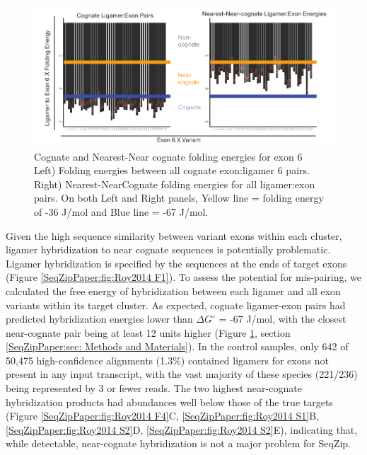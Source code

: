 		\begin{figure} %
			\centering 
			\includegraphics{Figures/SeqZipPaper/Roy2014FigS3.eps}
			\caption[Cognate and Nearest-Near cognate folding energies for \dscam{} exon 6]
			{
				Cognate and Nearest-Near cognate folding energies for \dscam{} exon 6\\[0.25cm]
				Left) Folding energies between all cognate exon:ligamer 6 pairs. Right) Nearest-NearCognate folding energies for all ligamer:exon pairs. On both Left and Right panels, Yellow line = folding energy of -36 J/mol and Blue line = -67 J/mol.
				}
			\label{SeqZipPaper:fig:Roy2014 FS3}
			\end{figure}

		Given the high sequence similarity between variant exons within each cluster, ligamer hybridization to near cognate sequences is potentially problematic. Ligamer hybridization is specified by the sequences at the ends of target exons (Figure \ref{SeqZipPaper:fig:Roy2014 F1}). To assess the potential for mis-pairing, we calculated the free energy of hybridization \citep{Reuter2010} between each ligamer and all exon variants within its target cluster. As expected, cognate ligamer-exon pairs had predicted hybridization energies lower than $\Delta G^{\circ}$ = -67 J/mol, with the closest near-cognate pair being at least 12 units higher (Figure \ref{SeqZipPaper:fig:Roy2014 FS3}, section \ref{SeqZipPaper:sec: Methods and Materials}). In the control samples, only 642 of 50,475 high-confidence alignments (1.3\%) contained ligamers for exons not present in any input transcript, with the vast majority of these species (221/236) being represented by 3 or fewer reads.  The two highest near-cognate hybridization products had abundances well below those of the true targets (Figure \ref{SeqZipPaper:fig:Roy2014 F4}C, \ref{SeqZipPaper:fig:Roy2014 S1}B, \ref{SeqZipPaper:fig:Roy2014 S2}D, \ref{SeqZipPaper:fig:Roy2014 S2}E), indicating that, while detectable, near-cognate hybridization is not a major problem for SeqZip.

